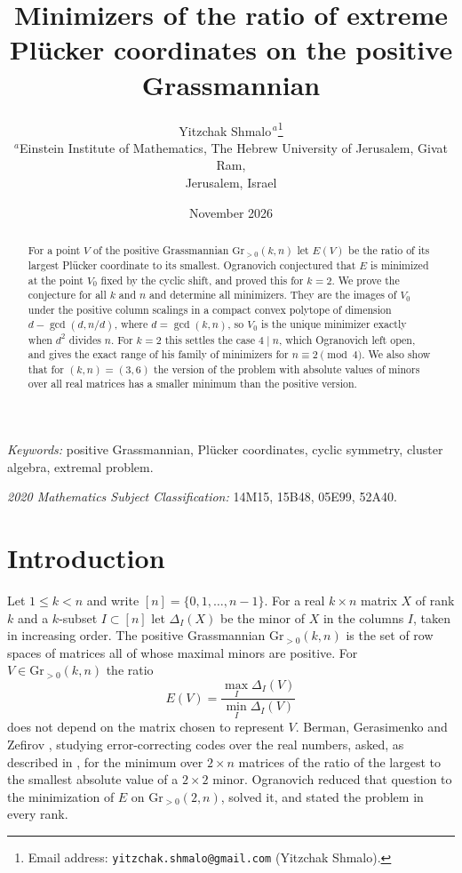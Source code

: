 \documentclass[11pt]{article}
\title{Minimizers of the ratio of extreme Pl\"ucker coordinates on the positive Grassmannian}
\author{Yitzchak Shmalo$^{\,a}$\thanks{Email address:
\texttt{yitzchak.shmalo@gmail.com} (Yitzchak Shmalo).}\\
{\small $^{a}$Einstein Institute of Mathematics, The Hebrew University of
Jerusalem, Givat Ram,}\\
{\small Jerusalem, Israel}}
\date{November 2026}
\theoremstyle{remark}
\newcommand{\Gr}{\mathrm{Gr}}
\begin{document}
\maketitle

\begin{abstract}
For a point $V$ of the positive Grassmannian $\Gr_{>0}(k,n)$ let $E(V)$ be the ratio of its largest Pl\"ucker coordinate to its smallest. Ogranovich conjectured that $E$ is minimized at the point $V_0$ fixed by the cyclic shift, and proved this for $k=2$. We prove the conjecture for all $k$ and $n$ and determine all minimizers. They are the images of $V_0$ under the positive column scalings in a compact convex polytope of dimension $d-\gcd(d,n/d)$, where $d=\gcd(k,n)$, so $V_0$ is the unique minimizer exactly when $d^2$ divides $n$. For $k=2$ this settles the case $4\mid n$, which Ogranovich left open, and gives the exact range of his family of minimizers for $n\equiv2\pmod4$. We also show that for $(k,n)=(3,6)$ the version of the problem with absolute values of minors over all real matrices has a smaller minimum than the positive version.
\end{abstract}

\noindent\textit{Keywords:} positive Grassmannian, Pl\"ucker coordinates, cyclic symmetry, cluster algebra, extremal problem.

\noindent\textit{2020 Mathematics Subject Classification:} 14M15, 15B48, 05E99, 52A40.

\section{Introduction}\label{sec:intro}

Let $1\le k<n$ and write $[n]=\{0,1,\dots,n-1\}$. For a real $k\times n$ matrix $X$ of rank $k$ and a $k$-subset $I\subset[n]$ let $\Delta_I(X)$ be the minor of $X$ in the columns $I$, taken in increasing order. The positive Grassmannian $\Gr_{>0}(k,n)$ is the set of row spaces of matrices all of whose maximal minors are positive. For $V\in\Gr_{>0}(k,n)$ the ratio
\[
E(V)=\frac{\max_I\Delta_I(V)}{\min_I\Delta_I(V)}
\]
does not depend on the matrix chosen to represent $V$. Berman, Gerasimenko and Zefirov \cite{BGZ}, studying error-correcting codes over the real numbers, asked, as described in \cite{O}, for the minimum over $2\times n$ matrices of the ratio of the largest to the smallest absolute value of a $2\times2$ minor. Ogranovich \cite{O} reduced that question to the minimization of $E$ on $\Gr_{>0}(2,n)$, solved it, and stated the problem in every rank.
\end{document}
